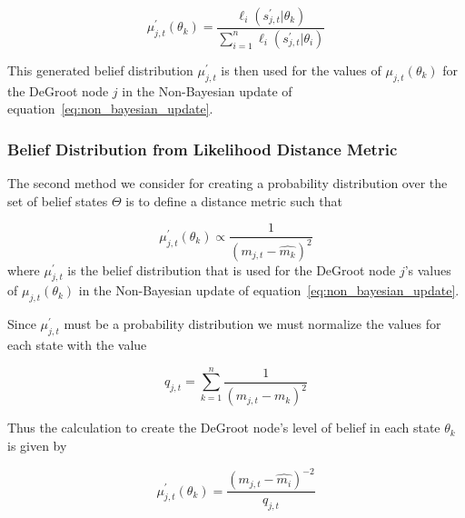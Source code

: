 \documentclass[letterpaper, 11pt, conference]{ieeeconf}
\begin{document}
\begin{equation}
\mu_{j,t}^\prime(\theta_k) = \frac{\ell_i(s_{j,t}^\prime|\theta_k)}{\sum_{i=1}^{n} \ell_i(s_{j,t}^\prime|\theta_i)}
\end{equation}

This generated belief distribution $\mu_{j,t}^\prime$ is then used for the values of $\mu_{j,t}(\theta_k)$ for the DeGroot node $j$ in the Non-Bayesian update of equation~\ref{eq:non_bayesian_update}.

\subsubsection{Belief Distribution from Likelihood Distance Metric}
\label{sec:likelihood_metric}

The second method we consider for creating a probability distribution over the set of belief states $\Theta$ is to define a distance metric such that

\begin{equation}
\mu_{j,t}^\prime(\theta_k) \propto \frac{1}{(m_{j,t}-\hat{m_k})^2}
\end{equation}
where $\mu_{j,t}^\prime$ is the belief distribution that is used for the DeGroot node $j$'s values of $\mu_{j,t}(\theta_k)$ in the Non-Bayesian update of equation~\ref{eq:non_bayesian_update}.

Since $\mu_{j,t}^\prime$ must be a probability distribution we must normalize the values for each state with the value

\begin{equation}
q_{j,t} = \sum_{k=1}^n \frac{1}{(m_{j,t}-\hat{m_k})^2}
\end{equation}

Thus the calculation to create the DeGroot node's level of belief in each state $\theta_k$ is given by

\begin{equation}
\mu_{j,t}^\prime(\theta_k) = \frac{(m_{j,t}-\hat{m_i})^{-2}}{q_{j,t}}
\end{equation}
\end{document}
